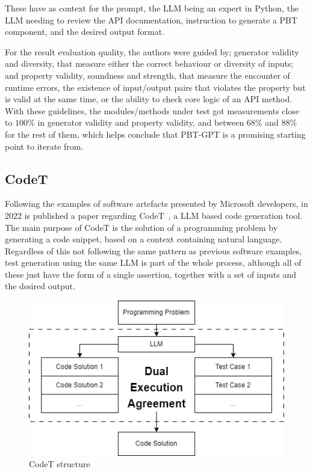 \documentclass[%
  chapterprefix=false,%
  open=right,%
  twoside=true,%
  paper=a4,%
  logofile={Figures/logo.png},%
  thesistype=master,%
  UKenglish,%
]{se2thesis}
\begin{document}
These have as context for the prompt, the LLM being an expert in Python, the LLM needing to review the API documentation, instruction to generate a PBT component, and the desired output format.

For the result evaluation quality, the authors were guided by; generator validity and diversity, that measure either the correct behaviour or diversity of inputs; and property validity, soundness and strength, that measure the encounter of runtime errors, the existence of input/output pairs that violates the property but is valid at the same time, or the ability to check core logic of an API method.
With these guidelines, the modules/methods under test got measurements close to \(100\%\) in generator validity and property validity, and between \(68\%\) and \(88\%\) for the rest of them, which helps conclude that PBT-GPT is a promising starting point to iterate from.
\subsection{CodeT}

Following the examples of software artefacts presented by Microsoft developers, in 2022 is published a paper regarding CodeT~\cite{DBLP:journals/corr/abs-2207-10397}, a LLM based code generation tool.
The main purpose of CodeT is the solution of a programming problem by generating a code snippet, based on a context containing natural language.
Regardless of this not following the same pattern as previous software examples, test generation using the same LLM is part of the whole process, although all of these just have the form of a single assertion, together with a set of inputs and the desired output.

\begin{figure}[tb]
  \centering 
  \includegraphics[width=.99\textwidth]{Figures/codet.png}
  \caption{CodeT structure}\label{fig:codet}
\end{figure}
\end{document}
